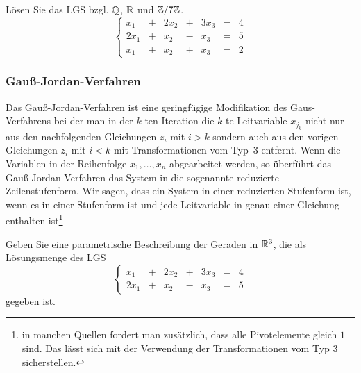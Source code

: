 \begin{appendices}
\begin{bsp}
	Lösen Sie das LGS bzgl. $\mathbb Q$, $\mathbb R$ und $\mathbb Z / 7 \mathbb Z$. 
	\[
	\left\{
	\begin{array}{ccccccc}
		 x_1 &  +&  2 x_2 & + & 3 x_3 &  = & 4
\\		 2 x_1 & + & x_2 & -&  x_3 & =&  5
\\		 x_1 & + & x_2 & + & x_3 & = & 2
	\end{array}\right. 
	\]
\end{bsp} 

\subsubsection{Gauß-Jordan-Verfahren}

Das Gauß-Jordan-Verfahren ist eine geringfügige Modifikation des Gaus-Verfahrens bei der man in der $k$-ten Iteration die $k$-te Leitvariable $x_{j_k}$ nicht nur aus den nachfolgenden Gleichungen $z_i$ mit $i>k$ sondern auch aus den vorigen Gleichungen $z_i$ mit $i < k$ mit Transformationen vom Typ~3 entfernt. Wenn die Variablen in der Reihenfolge $x_1,\ldots,x_n$ abgearbeitet werden, so überführt das Gauß-Jordan-Verfahren das System in die sogenannte reduzierte Zeilenstufenform. Wir sagen, dass ein System in einer reduzierten Stufenform ist, wenn es in einer Stufenform ist und jede Leitvariable in genau einer Gleichung enthalten ist\footnote{in manchen Quellen fordert man zusätzlich, dass alle Pivotelemente gleich $1$ sind. Das lässt sich mit der Verwendung der Transformationen vom Typ 3 sicherstellen.}

\begin{bsp}
	Geben Sie eine parametrische Beschreibung der Geraden in $\mathbb R^3$, die als Lösungsmenge des LGS
	\[
	\left\{
\begin{array}{ccccccc}
	x_1 &  +&  2 x_2 & + & 3 x_3 &  = & 4
	\\		 2 x_1 & + & x_2 & -&  x_3 & =&  5
\end{array}\right. 
	\]
	gegeben ist. 
\end{bsp} 

\end{appendices}
